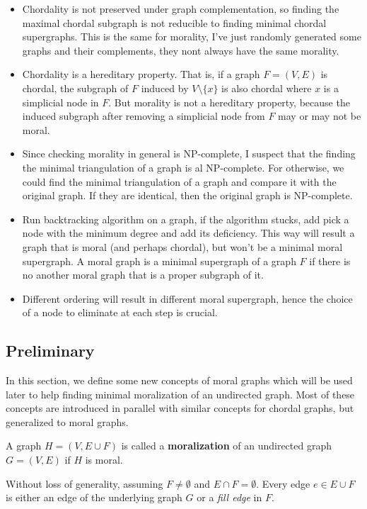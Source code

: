 \begin{itemize}
\item Chordality is not preserved under graph complementation, so finding the maximal chordal subgraph is not reducible to finding minimal chordal supergraphs. This is the same for morality, I've just randomly generated some graphs and their complements, they nont always have the same morality. 
\item Chordality is a hereditary property. That is, if a graph $F=(V,E)$ is chordal, the subgraph of $F$ induced by $V\setminus \{x\}$ is also chordal where $x$ is a simplicial node in $F$. But morality is not a hereditary property, because the induced subgraph after removing a simplicial node from $F$ may or may not be moral. 
\item Since checking morality in general is NP-complete, I suspect that the finding the minimal triangulation of a graph is al NP-complete. For otherwise, we could find the minimal triangulation of a graph and compare it with the original graph. If they are identical, then the original graph is NP-complete. 
\item Run backtracking algorithm on a graph, if the algorithm stucks, add pick a node with the minimum degree and add its deficiency. This way will result a graph that is moral (and perhaps chordal), but won't be a minimal moral supergraph. A moral graph is a minimal supergraph of a graph $F$ if there is no another moral graph that is a proper subgraph of it. 
\item Different ordering will result in different moral supergraph, hence the choice of a node to eliminate at each step is crucial. 
\end{itemize}

\subsection{Preliminary}
In this section, we define some new concepts of moral graphs which will be used later to help finding minimal moralization of an undirected graph. Most of these concepts are introduced in parallel with similar concepts for chordal graphs, but generalized to moral graphs. 

\begin{definition}
A graph $H=(V,E\cup F)$ is called a \textbf{moralization} of an undirected graph $G=(V,E)$ if $H$ is moral. 
\end{definition}

Without loss of generality, assuming $F\neq \emptyset$ and $E\cap F=\emptyset$. Every edge $e\in E\cup F$ is either an edge of the underlying graph $G$ or a \textit{fill edge} in $F$. 

